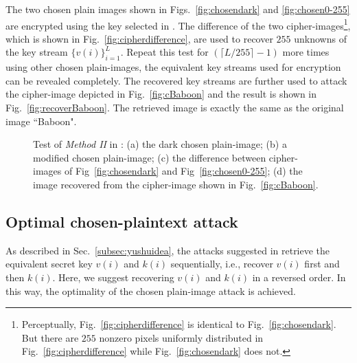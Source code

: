 \documentclass[smallextended, final]{svjour3}          \smartqed
\newlength\imagewidth
\begin{document}
The two chosen plain images shown in Figs.~\ref{fig:chosendark} and \ref{fig:chosen0-255} are encrypted using the key selected in \cite[Sec.~4.1]{li2012image}.
The difference of the two cipher-images\footnote{Perceptually, Fig.~\ref{fig:cipherdifference} is identical to Fig.~\ref{fig:chosendark}. But
there are $255$ nonzero pixels uniformly distributed in Fig.~\ref{fig:cipherdifference} while  Fig.~\ref{fig:chosendark} does not.},
which is shown in Fig.~\ref{fig:cipherdifference}, are used to recover $255$ unknowns of the key stream $\{v(i)\}_{i=1}^{L}$.
Repeat this test for $(\lceil L/255\rceil-1)$ more times using other chosen plain-images, the equivalent key streams used for encryption can be revealed completely.
The recovered key streams are further used to attack the cipher-image depicted in Fig.~\ref{fig:cBaboon} and the result is shown in Fig.~\ref{fig:recoverBaboon}.
The retrieved image is exactly the same as the original image ``Baboon".

\begin{figure}[!htb]
\centering
{}
\subfigure[]{
    \label{fig:chosen0-255}
    \begin{minipage}[t]{\imagewidth}
    \centering
    \texttt{[image: 0-255]}
    \end{minipage}}
\caption{Test of \textit{Method II} in \cite{zhang2014cryptanalysis}:
(a) the dark chosen plain-image;
(b) a modified chosen plain-image;
(c) the difference between cipher-images of Fig~\ref{fig:chosendark} and Fig~\ref{fig:chosen0-255};
(d) the image recovered from the cipher-image shown in Fig.~\ref{fig:cBaboon}.}
\label{fig:yushuattack2}
\end{figure}

\subsection{Optimal chosen-plaintext attack}
\label{subsec:cpa}
As described in Sec.~\ref{subsec:yushuidea}, the attacks suggested in \cite{zhang2014cryptanalysis} retrieve the equivalent secret key $v(i)$ and $k(i)$
sequentially, i.e., recover $v(i)$ first and then $k(i)$. Here, we suggest recovering $v(i)$ and $k(i)$ in a reversed order. In this way, the optimality
of the chosen plain-image attack is achieved.
\end{document}

